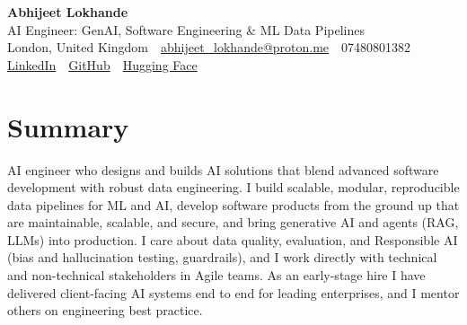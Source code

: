 \documentclass[10pt,a4paper]{article}
\newcommand{\sep}{\,\textcolor{accent!60}{\textbar}\,}
\begin{document}
\begin{center}
  {\fontsize{24}{26}\selectfont\bfseries Abhijeet Lokhande}\\[3pt]
  {\color{accent}\large AI Engineer: GenAI, Software Engineering \& ML Data Pipelines}\\[5pt]
  {\small
    London, United Kingdom \sep
    \href{mailto:abhijeet_lokhande@proton.me}{abhijeet\_lokhande@proton.me} \sep
    07480801382 \\[2pt]
    \href{https://www.linkedin.com/in/ablds/}{LinkedIn} \sep
    \href{https://github.com/abhijeetscode}{GitHub} \sep
    \href{https://huggingface.co/ab-ai}{Hugging Face}
  }
\end{center}
\vspace{2pt}

\section{Summary}
AI engineer who designs and builds AI solutions that blend advanced software development with robust data engineering. I build scalable, modular, reproducible data pipelines for ML and AI, develop software products from the ground up that are maintainable, scalable, and secure, and bring generative AI and agents (RAG, LLMs) into production. I care about data quality, evaluation, and Responsible AI (bias and hallucination testing, guardrails), and I work directly with technical and non-technical stakeholders in Agile teams. As an early-stage hire I have delivered client-facing AI systems end to end for leading enterprises, and I mentor others on engineering best practice.

\end{document}
